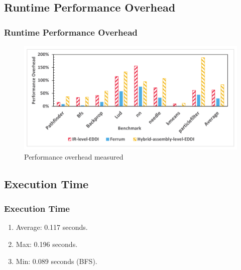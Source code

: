 \documentclass[
	12pt, %
]{beamer}
\begin{document}
\subsection{Runtime Performance Overhead}
\begin{frame}
	\frametitle{Runtime Performance Overhead}
	
	\begin{figure}
		\centering
		\includegraphics[width=1\linewidth]{img9.png}
		\caption{Performance overhead measured}
		\label{Performance overhead measured}
	\end{figure}
\end{frame}



\subsection{Execution Time}
\begin{frame}
	\frametitle{Execution Time}
	
	\begin{enumerate}
		\item Average: 0.117 seconds.
		\item Max: 0.196 seconds.
		\item Min: 0.089 seconds (BFS).
	\end{enumerate}
\end{frame}
\end{document}
